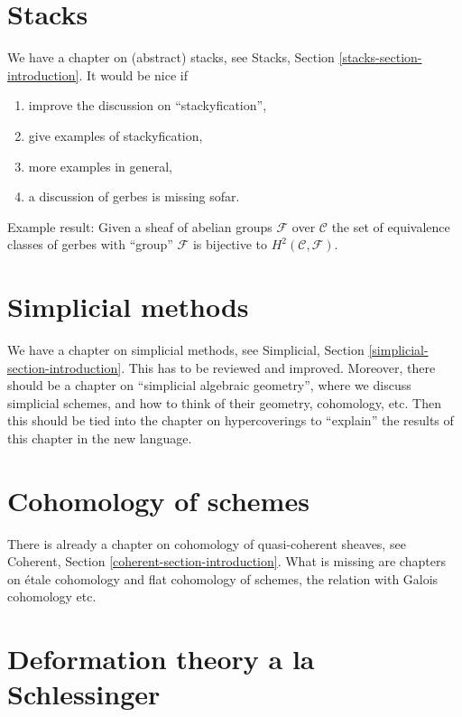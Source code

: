 \section{Stacks}
\label{section-stacks}

\noindent
We have a chapter on (abstract) stacks, see
Stacks, Section \ref{stacks-section-introduction}.
It would be nice if
\begin{enumerate}
\item improve the discussion on ``stackyfication'',
\item give examples of stackyfication,
\item more examples in general,
\item a discussion of gerbes is missing sofar.
\end{enumerate}

\medskip\noindent
Example result: Given a sheaf of abelian groups $\mathcal{F}$
over $\mathcal{C}$ the set of equivalence classes of gerbes with ``group''
$\mathcal{F}$ is bijective to $H^2(\mathcal{C}, \mathcal{F})$.


\section{Simplicial methods}
\label{section-simplicial}

\noindent
We have a chapter on simplicial methods, see
Simplicial, Section \ref{simplicial-section-introduction}.
This has to be reviewed and improved. Moreover, there should be a
chapter on ``simplicial algebraic geometry'', where we discuss
simplicial schemes, and how to think of their geometry, cohomology,
etc. Then this should be tied into the chapter on hypercoverings
to ``explain'' the results of this chapter in the new language.


\section{Cohomology of schemes}
\label{section-schemes-cohomology}

\noindent
There is already a chapter on cohomology of quasi-coherent sheaves, see
Coherent, Section \ref{coherent-section-introduction}.
What is missing are chapters on \'etale cohomology and flat cohomology
of schemes, the relation with Galois cohomology etc.


\section{Deformation theory a la Schlessinger}
\label{section-deformation-schlessinger}

